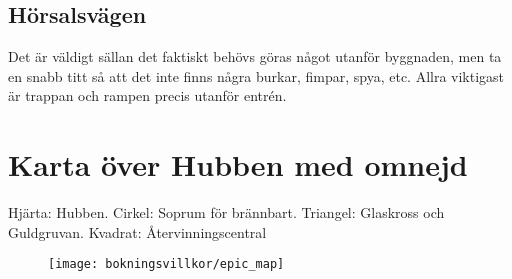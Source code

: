 \subsection{Hörsalsvägen}
Det är väldigt sällan det faktiskt behövs göras något utanför byggnaden, men ta en snabb titt så att det inte finns några burkar, fimpar, spya, etc. Allra viktigast är trappan och rampen precis utanför entrén.

\newpage
\section{Karta över Hubben med omnejd}
Hjärta: Hubben. Cirkel: Soprum för brännbart. Triangel: Glaskross och Guldgruvan. Kvadrat: Återvinningscentral
\begin{figure}[h]
    \centering
    \texttt{[image: bokningsvillkor/epic\_map]}
    \label{fig:map}
\end{figure}
